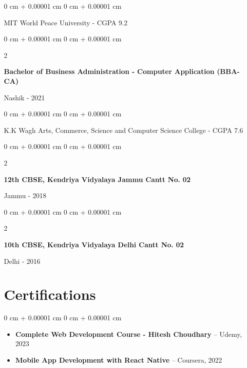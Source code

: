 \documentclass[10pt, letterpaper]{article}
\newenvironment{highlightsforbulletentries}{
    \begin{itemize}[
        topsep=0.10 cm,
        parsep=0.10 cm,
        partopsep=0pt,
        itemsep=0pt,
        leftmargin=10pt,
        labelindent=0pt
    ]
}{
    \end{itemize}
} %
\newenvironment{onecolentry}{
    \begin{adjustwidth}{
        0 cm + 0.00001 cm
    }{
        0 cm + 0.00001 cm
    }
}{
    \end{adjustwidth}
} %
\newenvironment{twocolentry}[2][]{
    \onecolentry
    \def\secondColumn{#2}
    \setcolumnwidth{\fill, 4.5 cm}
    \begin{paracol}{2}
}{
    \switchcolumn \raggedleft \secondColumn
    \end{paracol}
    \endonecolentry
} %
\begin{document}
        \vspace{0.10 cm}

        \begin{onecolentry}
            MIT World Peace University - CGPA 9.2
        \end{onecolentry}

        \hspace{0.10 cm}
        \begin{twocolentry}{Nashik - 2021}
            \textbf{Bachelor of Business Administration - Computer Application (BBA-CA)}
        \end{twocolentry}

        \vspace{0.10 cm}

        \begin{onecolentry}
            K.K Wagh Arts, Commerce, Science and Computer Science College - CGPA 7.6
        \end{onecolentry}

        \hspace{0.10 cm}
        \begin{twocolentry}{Jammu - 2018}
            \textbf{12th CBSE, Kendriya Vidyalaya Jammu Cantt No. 02}
        \end{twocolentry}


        \begin{twocolentry}{Delhi - 2016}
            \textbf{10th CBSE, Kendriya Vidyalaya Delhi Cantt No. 02}
        \end{twocolentry}


    \section{Certifications}

    \begin{onecolentry}
        \begin{highlightsforbulletentries}
            \item \textbf{Complete Web Development Course - Hitesh Choudhary} -- Udemy, 2023
            \item \textbf{Mobile App Development with React Native} -- Coursera, 2022
        \end{highlightsforbulletentries}
    \end{onecolentry}
\end{document}
